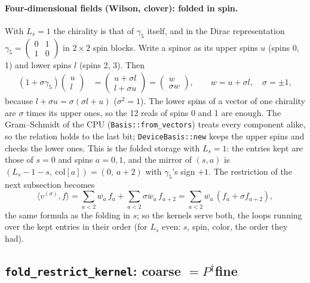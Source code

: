\documentclass[11pt,a4paper]{article}
\numberwithin{equation}{section}
\newcommand{\code}[1]{\texttt{\small #1}}
\newcommand{\dg}{^{\dagger}}
\begin{document}
\paragraph{Four-dimensional fields (Wilson, clover): folded in spin.} With $L_s=1$ the
chirality is that of $\gamma_5$ itself, and in the Dirac representation
$\gamma_5=\begin{pmatrix}0&1\\1&0\end{pmatrix}$ in $2\times2$ spin blocks. Write a spinor as its
upper spins $u$ (spins 0, 1) and lower spins $l$ (spins 2, 3). Then
\begin{align}
(1+\sigma\gamma_5)\begin{pmatrix}u\\l\end{pmatrix}
&= \begin{pmatrix}u+\sigma l\\ l+\sigma u\end{pmatrix}
 = \begin{pmatrix}w\\ \sigma w\end{pmatrix},\qquad w = u+\sigma l,\quad \sigma=\pm1,
\end{align}
because $l+\sigma u = \sigma(\sigma l + u)$ ($\sigma^2=1$). The lower spins of a vector of one
chirality are $\sigma$ times its upper ones, so the 12 reals of spins 0 and 1 are enough. The
Gram--Schmidt of the CPU (\code{Basis::from\_vectors}) treats every component alike, so the
relation holds to the last bit; \code{DeviceBasis::new} keeps the upper spins and checks the
lower ones. This is the folded storage with $L_s=1$: the entries kept are those of $s=0$ and
spins $a=0,1$, and the mirror of $(s,a)$ is $(L_s-1-s,\ \mathrm{col}[a]) = (0,\ a+2)$ with
$\gamma_5$'s sign $+1$. The restriction of the next subsection becomes
\begin{equation}
\langle v^{(\sigma)}, f\rangle = \sum_{a<2}\overline{w_a}\,f_a + \sum_{a<2}\overline{\sigma w_a}\,f_{a+2}
 = \sum_{a<2}\overline{w_a}\,(f_a+\sigma f_{a+2}),
\end{equation}
the same formula as the folding in $s$; so the kernels serve both, the loops running over the kept
entries in their order (for $L_s$ even: $s$, spin, color, the order they had).

\subsection{\code{fold\_restrict\_kernel}: coarse $=P\dg$fine}
\end{document}
